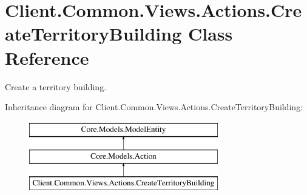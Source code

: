 \hypertarget{classClient_1_1Common_1_1Views_1_1Actions_1_1CreateTerritoryBuilding}{}\section{Client.\+Common.\+Views.\+Actions.\+Create\+Territory\+Building Class Reference}
\label{classClient_1_1Common_1_1Views_1_1Actions_1_1CreateTerritoryBuilding}


Create a territory building.  


Inheritance diagram for Client.\+Common.\+Views.\+Actions.\+Create\+Territory\+Building\+:\begin{figure}[H]
\begin{center}
\leavevmode
\includegraphics[height=3.000000cm]{classClient_1_1Common_1_1Views_1_1Actions_1_1CreateTerritoryBuilding}
\end{center}
\end{figure}
